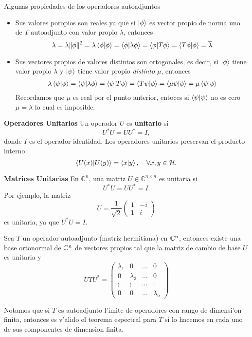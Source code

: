 \documentclass[main.tex]{subfiles}
\begin{document}
Algunas propiedades de los operadores autoadjuntos
\begin{itemize}
  \item Sus valores poropios son reales ya que si \(\ket{\phi}\) es vector propio de norma uno de $T$ autoadjunto con valor propio \(\lambda\), entonces
        \begin{align*}
        \lambda=\lambda\|\phi\|^{2}=\lambda\braket{\phi|\phi}=\braket{\phi|\lambda\phi}=\braket{\phi|T\phi}=\braket{T\phi|\phi}=\overline{\lambda}
        \end{align*}
  \item Sus vectores propios de valores distintos son ortogonales, es decir, si $\ket{\phi}$ tiene valor propio $\lambda$ y $\ket{\psi}$ tiene valor propio \emph{distinto} $\mu$, entonces
        \begin{align*}
        \lambda\braket{\psi|\phi}=\braket{\psi|\lambda\phi}=\braket{\psi|T\phi}=\braket{T\psi|\phi}=\braket{\mu\psi|\phi}=\mu\braket{\psi|\phi}
        \end{align*}
        Recordamos que $\mu$ es real por el punto anterior, entoces si $\braket{\psi|\psi}$ no es cero $\mu=\lambda$ lo cual es imposible.
\end{itemize}
\eje\textbf{Operadores Unitarios}
Un operador $U$ es \textbf{unitario} si
\[
U^* U = U U^* = I,
\]
donde $I$ es el operador identidad. Los operadores unitarios preservan el producto interno
\[
\braket{ U(x)| U(y)} = \braket{ x | y}, \quad \forall x, y \in \mathcal{H}.
\]

\eje\textbf{Matrices Unitarias}
En $\mathbb{C}^n$, una matriz $U \in \mathbb{C}^{n \times n}$ es unitaria si
\[
U^* U = U U^* = I.
\]
Por ejemplo, la matriz
\[
U = \frac{1}{\sqrt{2}} \begin{pmatrix}
1 & -i \\
1 & i
\end{pmatrix}
\]
es unitaria, ya que $U^* U = I$.
\begin{teorema}
Sea \(T\) un operador autoadjunto (matriz hermitiana) en $\mathbb{C}^n$, entonces existe una base ortonormal de \(\mathbb{C}^n\) de vectores propios tal que la matriz de cambio de base \(U\) es unitaria y
\[
UTU^{*}= \begin{pmatrix}\lambda_{1}& 0 & \dots & 0\\ 0 & \lambda_{2} & \dots & 0\\ \vdots & \vdots & \cdots & \vdots\\ 0 & 0 & \dots & \lambda_{n} \end{pmatrix}
\]
\end{teorema}
\obs Notamos que si $T$ es autoadjunto l'imite de operadores con rango de dimensi'on finita, entonces es v'alido  el teorema espectral para $T$ si lo hacemos en cada uno de sus componentes de dimension finita.
\end{document}
